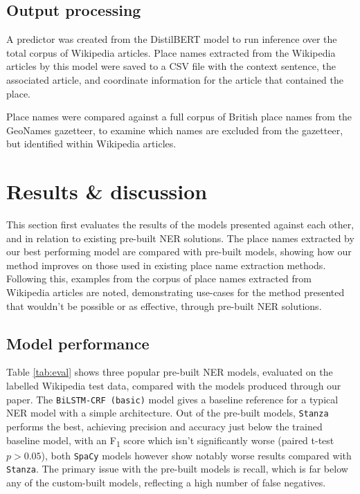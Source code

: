 \documentclass[]{interact}
\theoremstyle{plain}%
\theoremstyle{definition}
\theoremstyle{remark}
\begin{document}
\hypertarget{output-processing}{%
\subsection{Output processing}\label{output-processing}}

A predictor was created from the DistilBERT model to run inference over
the total corpus of Wikipedia articles. Place names extracted from the
Wikipedia articles by this model were saved to a CSV file with the
context sentence, the associated article, and coordinate information for
the article that contained the place.

Place names were compared against a full corpus of British place names
from the GeoNames gazetteer, to examine which names are excluded from
the gazetteer, but identified within Wikipedia articles.

\hypertarget{results-discussion}{%
\section{Results \& discussion}\label{results-discussion}}

This section first evaluates the results of the models presented against
each other, and in relation to existing pre-built NER solutions. The
place names extracted by our best performing model are compared with
pre-built models, showing how our method improves on those used in
existing place name extraction methods. Following this, examples from
the corpus of place names extracted from Wikipedia articles are noted,
demonstrating use-cases for the method presented that wouldn't be
possible or as effective, through pre-built NER solutions.

\hypertarget{model-performance}{%
\subsection{Model performance}\label{model-performance}}

Table \ref{tab:eval} shows three popular pre-built NER models, evaluated
on the labelled Wikipedia test data, compared with the models produced
through our paper. The \texttt{BiLSTM-CRF\ (basic)} model gives a
baseline reference for a typical NER model with a simple architecture.
Out of the pre-built models, \texttt{Stanza} performs the best,
achieving precision and accuracy just below the trained baseline model,
with an F\textsubscript{1} score which isn't significantly worse (paired
t-test \(p>0.05\)), both \texttt{SpaCy} models however show notably
worse results compared with \texttt{Stanza}. The primary issue with the
pre-built models is recall, which is far below any of the custom-built
models, reflecting a high number of false negatives.
\end{document}
